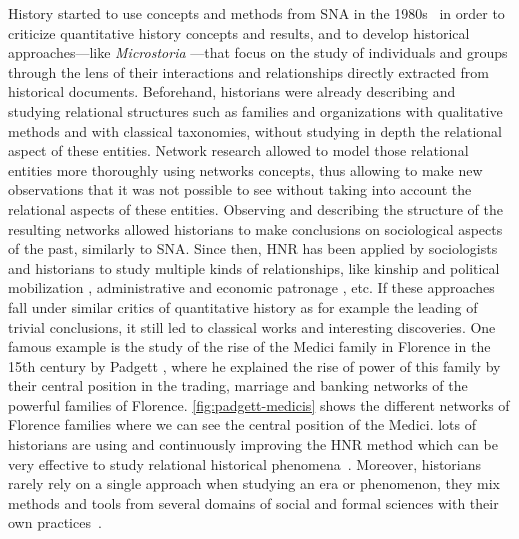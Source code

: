 History started to use concepts and methods from SNA in the 1980s~\cite{wetherellHistoricalSocialNetwork1998} in order to criticize quantitative history concepts and results,
and to develop historical approaches---like \textit{Microstoria} \cite{ginzburgMicrohistoire1981}---that focus on the study of individuals and groups through the lens of their interactions and relationships directly extracted from historical documents.
Beforehand, historians were already describing and studying relational structures such as families and organizations with qualitative methods and with classical taxonomies, without studying in depth the relational aspect of these entities.
Network research allowed to model those relational entities more thoroughly using networks concepts, thus allowing to make new observations that it was not possible to see without taking into account the relational aspects of these entities.
Observing and describing the structure of the resulting networks allowed historians to make conclusions on sociological aspects of the past, similarly to SNA.
Since then, HNR has been applied by sociologists and historians to study multiple kinds of relationships, like kinship and political mobilization \cite{lippKinshipNetworksLocal2005}, administrative and economic patronage \cite{moutoukias1992}, etc.
If these approaches fall under similar critics of quantitative history \cite{lemercier12FormalNetwork2015} as for example the leading of trivial conclusions, it still led to classical works and interesting discoveries.
One famous example is the study of the rise of the Medici family in Florence in the 15th century by Padgett \cite{padgettRobustActionRise1993}, where he explained the rise of power of this family by their central position in the trading, marriage and banking networks of the powerful families of Florence. \autoref{fig:padgett-medicis} shows the different networks of Florence families where we can see the central position of the Medici.
lots of historians are using and continuously improving the HNR method which can be very effective to study relational historical phenomena~\cite{kerschbaumerPowerNetworksProspects2015}.
Moreover, historians rarely rely on a single approach when studying an era or phenomenon, they mix methods and tools from several domains of social and formal sciences with their own practices~\cite{padgettRobustActionRise1993, petzCombiningNetworkResearch2022}.


